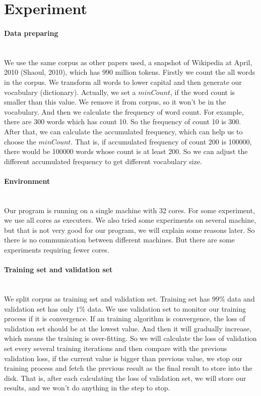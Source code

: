 \section{Experiment}

\paragraph{Data preparing} \ \\
We use the same corpus as other papers used, a snapshot of Wikipedia at April, 2010 (Shaoul, 2010), which has 990 million tokens. Firstly we count the all words in the corpus. We transform all words to lower capital and then generate our vocabulary (dictionary). Actually, we set a $minCount$, if the word count is smaller than this value. We remove it from corpus, so it won't be in the vocabulary. And then we calculate the frequency of word count. For example, there are 300 words which has count 10. So the frequency of count 10 is 300. After that, we can calculate the accumulated frequency, which can help us to choose the $minCount$. That is, if accumulated frequency of count 200 is 100000, there would be 100000 words whose count is at least 200. So we can adjust the different accumulated frequency to get different vocabulary size.

\paragraph{Environment} \ \\
Our program is running on a single machine with 32 cores. For some experiment, we use all cores as executers. We also tried some experiments on several machine, but that is not very good for our program, we will explain some reasons later. So there is no communication between different machines.  But there are some experiments requiring fewer cores.

\paragraph{Training set and validation set} \ \\
We split corpus as training set and validation set. Training set has $99\%$ data and validation set has only $1\%$ data. We use validation set to monitor our training process if it is convergence. If an training algorithm is convergence, the loss of validation set should be at the lowest value. And then it will gradually increase, which means the training is over-fitting. So we will calculate the loss of validation set every several training iterations and then compare with the previous validation loss, if the current value is bigger than previous value, we stop our training process and fetch the previous result as the final result to store into the disk. That is, after each calculating the loss of validation set, we will store our results, and we won't do anything in the step to stop. \\

